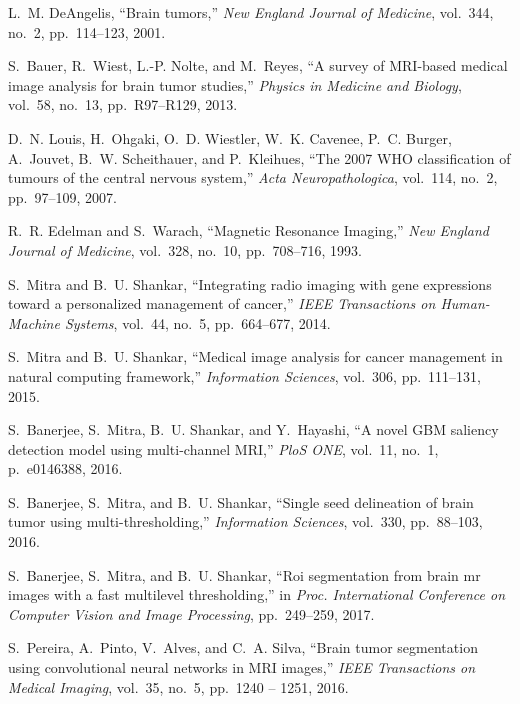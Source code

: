 \documentclass[journal,twocolumn]{IEEEtran}
\begin{document}

\begin{thebibliography}{10}

L.~M. DeAngelis, ``{Brain tumors},'' {\em New England Journal of Medicine},
  vol.~344, no.~2, pp.~114--123, 2001.

S.~Bauer, R.~Wiest, L.-P. Nolte, and M.~Reyes, ``{A survey of MRI-based medical
  image analysis for brain tumor studies},'' {\em Physics in Medicine and
  Biology}, vol.~58, no.~13, pp.~R97--R129, 2013.

D.~N. Louis, H.~Ohgaki, O.~D. Wiestler, W.~K. Cavenee, P.~C. Burger, A.~Jouvet,
  B.~W. Scheithauer, and P.~Kleihues, ``{The 2007 WHO classification of tumours
  of the central nervous system},'' {\em Acta Neuropathologica}, vol.~114,
  no.~2, pp.~97--109, 2007.

R.~R. Edelman and S.~Warach, ``{Magnetic Resonance Imaging},'' {\em New England
  Journal of Medicine}, vol.~328, no.~10, pp.~708--716, 1993.

S.~Mitra and B.~U. Shankar, ``Integrating radio imaging with gene expressions
  toward a personalized management of cancer,'' {\em IEEE Transactions on
  Human-Machine Systems}, vol.~44, no.~5, pp.~664--677, 2014.

S.~Mitra and B.~U. Shankar, ``Medical image analysis for cancer management in
  natural computing framework,'' {\em Information Sciences}, vol.~306,
  pp.~111--131, 2015.

S.~Banerjee, S.~Mitra, B.~U. Shankar, and Y.~Hayashi, ``A novel {GBM} saliency
  detection model using multi-channel {MRI},'' {\em {PloS ONE}}, vol.~11,
  no.~1, p.~e0146388, 2016.

S.~Banerjee, S.~Mitra, and B.~U. Shankar, ``Single seed delineation of brain
  tumor using multi-thresholding,'' {\em Information Sciences}, vol.~330,
  pp.~88--103, 2016.

S.~Banerjee, S.~Mitra, and B.~U. Shankar, ``Roi segmentation from brain mr
  images with a fast multilevel thresholding,'' in {\em Proc. International
  Conference on Computer Vision and Image Processing}, pp.~249--259, 2017.

S.~Pereira, A.~Pinto, V.~Alves, and C.~A. Silva, ``{Brain tumor segmentation
  using convolutional neural networks in MRI images},'' {\em IEEE Transactions
  on Medical Imaging}, vol.~35, no.~5, pp.~1240 -- 1251, 2016.


\end{thebibliography}
\end{document}
